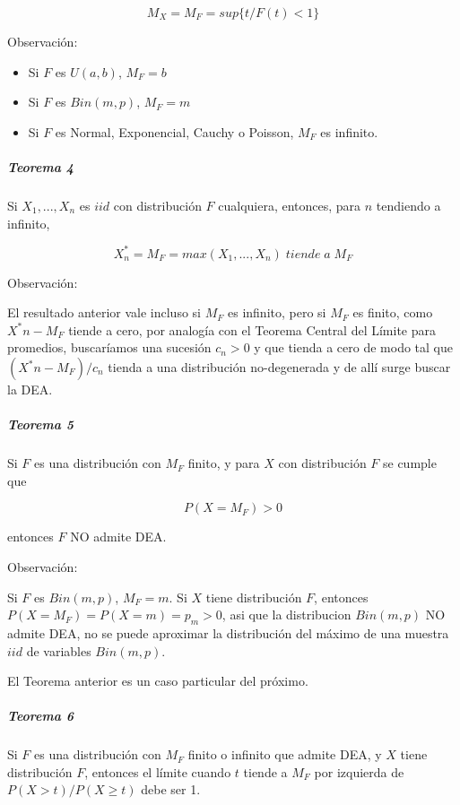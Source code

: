 \documentclass[
  12pt]{article}
\begin{document}
\begin{equation}
M_X=M_F= sup\{t / F(t)<1\}\label{eq:Mx}
\end{equation}

Observación:

\begin{itemize}
\item Si $F$ es $U(a,b)$, $M_F=b$
\item Si $F$ es $Bin(m,p)$, $M_F=m$
\item Si $F$ es Normal, Exponencial, Cauchy o Poisson, $M_F$ es infinito.
\end{itemize}

\hypertarget{teorema-4}{%
\subparagraph{Teorema 4}\label{teorema-4}}

Si \(X_1,...,X_n\) es \(iid\) con distribución \(F\) cualquiera,
entonces, para \(n\) tendiendo a infinito,

\begin{equation}
X^*_n=M_F= max(X_1,...,X_n)\;tiende\;a\;M_F\label{eq:Xast}
\end{equation}

Observación:

El resultado anterior vale incluso si \(M_F\) es infinito, pero si
\(M_F\) es finito, como \(X^*n - M_F\) tiende a cero, por analogía con
el Teorema Central del Límite para promedios, buscaríamos una sucesión
\(c_n>0\) y que tienda a cero de modo tal que \((X^*n- M_F )/ c_n\)
tienda a una distribución no-degenerada y de allí surge buscar la DEA.

\hypertarget{teorema-5}{%
\subparagraph{Teorema 5}\label{teorema-5}}

Si \(F\) es una distribución con \(M_F\) finito, y para \(X\) con
distribución \(F\) se cumple que

\[
P(X=M_F)>0 
\]

entonces \(F\) NO admite DEA.

Observación:

Si \(F\) es \(Bin(m,p)\), \(M_F=m\). Si \(X\) tiene distribución \(F\),
entonces \(P( X=M_F)= P( X=m)= p_m>0\), asi que la distribucion
\(Bin(m,p)\) NO admite DEA, no se puede aproximar la distribución del
máximo de una muestra \(iid\) de variables \(Bin(m,p)\).

El Teorema anterior es un caso particular del próximo.

\hypertarget{teorema-6}{%
\subparagraph{Teorema 6}\label{teorema-6}}

Si \(F\) es una distribución con \(M_F\) finito o infinito que admite
DEA, y \(X\) tiene distribución \(F\), entonces el límite cuando \(t\)
tiende a \(M_F\) por izquierda de \(P(X>t)/P(X \geq t)\) debe ser 1.
\end{document}
